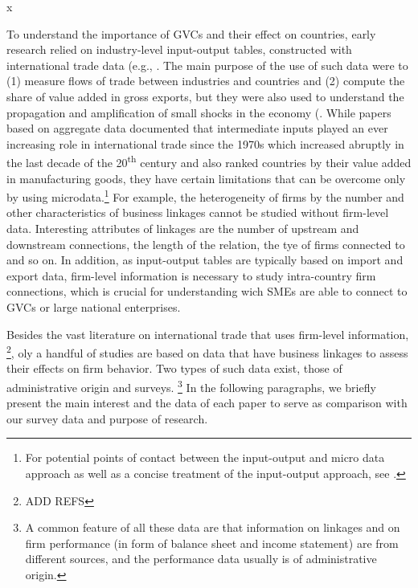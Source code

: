 x\documentclass[final, dvipsnames, authoryear,12pt]{elsarticle}
\begin{document}
To understand the importance of GVCs and their effect on countries, early research relied on industry-level input-output tables, constructed with international trade data (e.g., \cite{johnson2012accounting, hummels2001nature}. The main purpose of the use of such data were to (1) measure flows of trade between industries and countries and (2) compute the share of value added in gross exports, but they were also used to understand the propagation and amplification of small shocks in the economy (\cite{acemoglu2016networks}. While papers based on aggregate data documented that intermediate inputs played an ever increasing role in international trade since the 1970s which increased abruptly in the last decade of the 20\textsuperscript{th} century and also ranked countries by their value added in manufacturing goods, they have certain limitations that can be overcome only by using microdata.\footnote{For potential points of contact between the input-output and micro data approach as well as a concise treatment of the input-output approach, see \cite{johnson2018measuring}.} For example, the heterogeneity of firms by the number and other characteristics of business linkages cannot be studied without firm-level data. Interesting attributes of linkages are the number of upstream and downstream connections, the length of the relation, the tye of firms connected to and so on. In addition, as input-output tables are typically based on import and export data, firm-level information is necessary to study intra-country firm connections, which is crucial for understanding wich SMEs are able to connect to GVCs or large national enterprises.

Besides the vast literature on international trade that uses firm-level information, \footnote{ADD REFS}, oly a handful of studies are based on data that have business linkages to assess their effects on firm behavior. Two types of such data exist, those of administrative origin and surveys. \footnote{A common feature of all these data are that information on linkages and on firm performance (in form of balance sheet and income statement) are from different sources, and the performance data usually is of administrative origin.} In the following paragraphs, we briefly present the main interest and the data of each paper to serve as comparison with our survey data and purpose of research.
\end{document}
